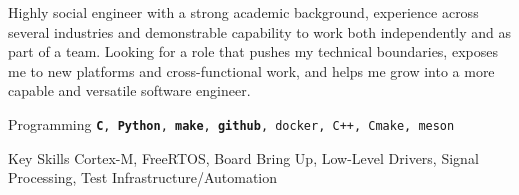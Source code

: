 
    Highly social engineer with a strong academic background, experience across several industries and demonstrable capability to work both independently and as part of a team.
    Looking for a role that pushes my technical boundaries, exposes me to new platforms and cross-functional work, and helps me grow into a more capable and versatile software engineer.

\begin{cvskills}

  \cvskill
    {Programming} %
    {\texttt{\textbf{C}, \textbf{Python}, \textbf{make}, \textbf{github}, docker, C++, Cmake, meson}} %

  \cvskill
    {Key Skills} %
    {Cortex-M, FreeRTOS, Board Bring Up, Low-Level Drivers, Signal Processing, Test Infrastructure/Automation} %

\end{cvskills}
